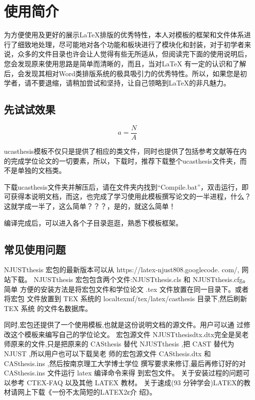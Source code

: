 
\chapter{使用简介}
\label{chap:guide}

为方便使用及更好的展示\LaTeX{}排版的优秀特性，本人对模板的框架和文件体系进行了细致地处理，尽可能地对各个功能和板块进行了模块化和封装，对于初学者来说，众多的文件目录也许会让人觉得有些无所适从，但阅读完下面的使用说明后，您会发现原来使用思路是简单而清晰的，而且，当对\LaTeX{} 有一定的认识和了解后，会发现其相对Word类排版系统的极具吸引力的优秀特性。所以，如果您是初学者，请不要退缩，请稍加尝试和坚持，让自己领略到\LaTeX{}的非凡魅力。

\section{先试试效果}

\begin{equation}
a=\frac{N}{A}
\end{equation}%
%
%
%

ucasthesis模板不仅只是提供了相应的类文件，同时也提供了包括参考文献等在内的完成学位论文的一切要素，所以，下载时，推荐下载整个ucasthesis文件夹，而不是单独的文档类。

下载ucasthesis文件夹并解压后，请在文件夹内找到“Compile.bat”，双击运行，即可获得本说明文档，而这，也完成了学习使用此模板撰写论文的一半进程，什么？这就学成一半了，这么简单？？？，是的，就这么简单！

编译完成后，可以进入各个子目录逛逛，熟悉下模板框架。

\section{常见使用问题}

NJUSTthesis 宏包的最新版本可以从 https://latex-njust808.googlecode. com/, 网站下载。
NJUSTthesis 宏包包含两个文件:NJUSTthesis.cls 和 NJUSTthesis.cfg。简单 方便的安装方法是将宏包文件和学位论文 .tex 文件放置在同一目录下。或者将宏包 文件放置到 TEX 系统的 localtexmf/tex/latex/casthesis 目录下,然后刷新 TEX 系统 的文件名数据库。

同时,宏包还提供了一个使用模板,也就是这份说明文档的源文件。用户可以通 过修改这个模板来编写自己的学位论文。
宏包源文件 NJUSTthesisdtx.dtx完全是吴老师原来的文件,只是把原来的 CASthesis 替代 NJUSTthesis ,把 CAST 替代为 NJUST ,所以用户也可以下载吴老 师的宏包源文件 CASthesis.dtx 和 CASthesis.ins ,然后按南京理工大学博士学位 撰写要求来修订,最后再修订好的对 CASthesis.ins 文件运行 latex 编译命令来得 到宏包文件。
关于安装过程的问题可以参考 CTEX-FAQ 以及其他 LATEX 教材。 关于速成(93 分钟学会)LATEX的教材请网上下载《一份不太简短的LATEX2ε介
绍》。

